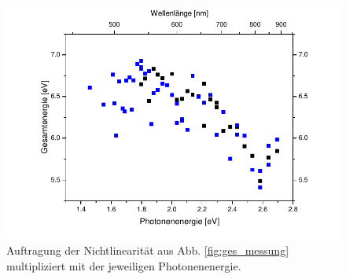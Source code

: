 \documentclass[bachelor,       %
               twoside,        %
               BCOR10mm,       %
               english,ngerman, %
               ]{GAUBM}
\begin{document}
 



\begin{figure}[h!]
\centering
\includegraphics{Gesamtenergie}
\caption{Auftragung der Nichtlinearität aus Abb. \ref{fig:ges_messung} multipliziert mit der jeweiligen Photonenenergie.}
\label{fig:ges_energie}
\end{figure}
\end{document}
